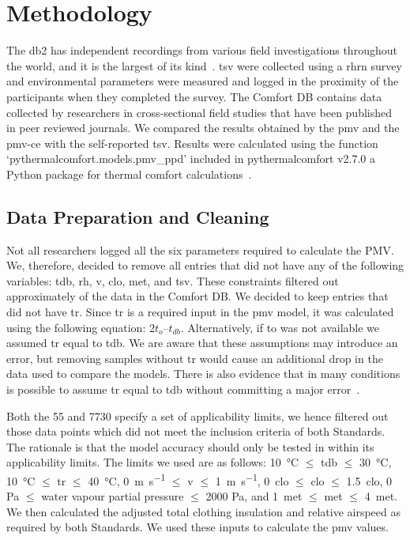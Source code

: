 

\section{Methodology}\label{sec:methodology}

The \gls{db2} has  independent recordings from various field investigations throughout the world, and it is the largest of its kind~\cite{FoldvaryLicina2018, db2dryad}.
\Ac{tsv} were collected using a \gls{rhrn} survey and environmental parameters were measured and logged in the proximity of the participants when they completed the survey.
The Comfort DB contains data collected by researchers in cross-sectional field studies that have been published in peer reviewed journals.
 We compared the results obtained by the \ac{pmv} and the \gls{pmv-ce} with the self-reported \ac{tsv}.
Results were calculated using the function `pythermalcomfort.models.pmv\_ppd' included in pythermalcomfort v2.7.0 a Python package for thermal comfort calculations~\cite{Tartarini2020a}.

\subsection{Data Preparation and Cleaning}\label{subsec:data-processing-and-cleaning}
Not all researchers logged all the six parameters required to calculate the PMV.\@
We, therefore, decided to remove all entries that did not have any of the following variables: \ac{tdb}, \ac{rh}, \ac{v}, \ac{clo}, \ac{met}, and \ac{tsv}.
These constraints filtered out approximately  of the data in the Comfort DB.\@
We decided to keep entries that did not have \ac{tr}.
Since \ac{tr} is a required input in the \ac{pmv} model, it was calculated using the following equation: $2 t_{o} – t_{db}$.
Alternatively, if \ac{to} was not available we assumed \ac{tr} equal to \ac{tdb}.
We are aware that these assumptions may introduce an error, but removing samples without \ac{tr} would cause an additional  drop in the data used to compare the models.
There is also evidence that in many conditions is possible to assume \ac{tr} equal to \ac{tdb} without committing a major error~\cite{Dawe2020}.

Both the \gls{55} and \gls{7730} specify a set of applicability limits, we hence filtered out those data points which did not meet the inclusion criteria of both Standards.
The rationale is that the model accuracy should only be tested in within its applicability limits.
The limits we used are as follows:
\qty{10}{\celsius} $\leq$ \ac{tdb} $\leq$ \qty{30}{\celsius},
\qty{10}{\celsius} $\leq$ \ac{tr} $\leq$ \qty{40}{\celsius},
\qty{0}{\m\per\s} $\leq$ \ac{v} $\leq$ \qty{1}{\m\per\s},
\qty{0}{clo} $\leq$ \ac{clo} $\leq$ \qty{1.5}{clo},
0 Pa $\leq$ water vapour partial pressure $\leq$ 2000 Pa,
and \qty{1}{met} $\leq$ \ac{met} $\leq$ \qty{4}{met}.
We then calculated the adjusted total clothing insulation and relative airspeed as required by both Standards.
We used these inputs to calculate the \ac{pmv} values.

